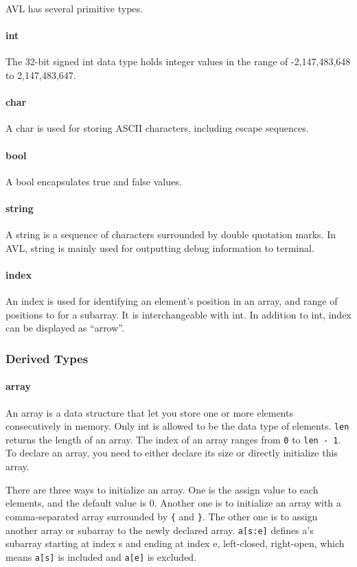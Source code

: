 AVL has several primitive types.

\paragraph{int}
The 32-bit signed int data type holds integer values in the range of -2,147,483,648 to
2,147,483,647.

\paragraph{char}
A char is used for storing ASCII characters, including escape sequences.

\paragraph{bool}
A bool encapsulates true and false values.

\paragraph{string}
A string is a sequence of characters surrounded by double quotation marks. In AVL, string is mainly
used for outputting debug information to terminal.

\paragraph{index}
An index is used for identifying an element’s position in an array, and range of positions to for a
subarray. It is interchangeable with int. In addition to int, index can be displayed as “arrow”.

\subsubsection{Derived Types}

\paragraph{array}
An array is a data structure that let you store one or more elements consecutively in memory. Only
int is allowed to be the data type of elements. \verb"len" returns the length of an array. The index
of an array ranges from \verb"0" to \verb"len - 1". To declare an array, you need to either declare
its size or directly initialize this array.

There are three ways to initialize an array. One is the assign value to each elements, and the
default value is 0. Another one is to initialize an array with a comma-separated array surrounded by
\verb"{" and \verb"}". The other one is to assign another array or subarray to the newly declared
array. \verb"a[s:e]" defines a’s subarray starting at index s and ending at index e, left-closed,
right-open, which means \verb"a[s]" is included and \verb"a[e]" is excluded.

